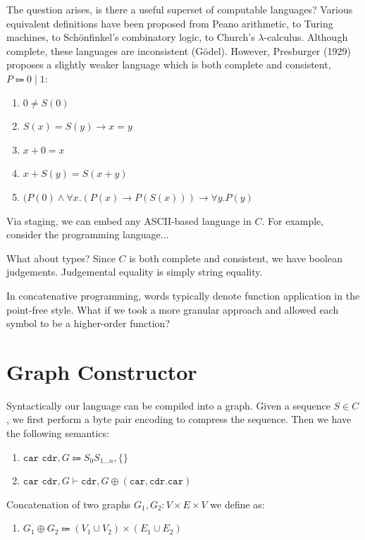 \documentclass[sigplan,10pt,review,anonymous]{acmart}
\begin{document}
The question arises, is there a useful superset of computable languages? Various equivalent definitions have been proposed from Peano arithmetic, to Turing machines, to Sch\"onfinkel's combinatory logic, to Church's $\lambda$-calculus. Although complete, these languages are inconsistent (G\"odel). However, Presburger (1929) proposes a slightly weaker language which is both complete and consistent, $P \Coloneqq 0 \mid 1$:

\begin{enumerate}
  \item $0 \neq S(0)            $
  \item $S(x) = S(y) \rightarrow x = y    $
  \item $x + 0 = x              $
  \item $x + S(y) = S(x + y)    $
  \item $(P(0) \land \forall x.(P(x) \rightarrow P(S(x))) \rightarrow \forall y.P(y)$
\end{enumerate}

Via staging, we can embed any ASCII-based language in $C$. For example, consider the programming language...

What about types? Since $C$ is both complete and consistent, we have boolean judgements. Judgemental equality is simply string equality.

In concatenative programming, words typically denote function application in the point-free style. What if we took a more granular approach and allowed each symbol to be a higher-order function?

\section{Graph Constructor}

Syntactically our language can be compiled into a graph. Given a sequence $S\in C$, we first perform a byte pair encoding to compress the sequence. Then we have the following semantics:

\begin{enumerate}
  \item $\texttt{car cdr}, G \Coloneqq S_0 S_{1\ldots n}, \{\}$
  \item $\texttt{car cdr}, G \vdash \texttt{cdr}, G \oplus (\texttt{car}, \texttt{cdr.car})$
\end{enumerate}

Concatenation of two graphs $G_1, G_2: V\times E \times V$ we define as:

\begin{enumerate}
  \item $G_1 \oplus G_2 \Coloneqq (V_1\cup V_2)\times (E_1\cup E_2) $
\end{enumerate}
\end{document}
